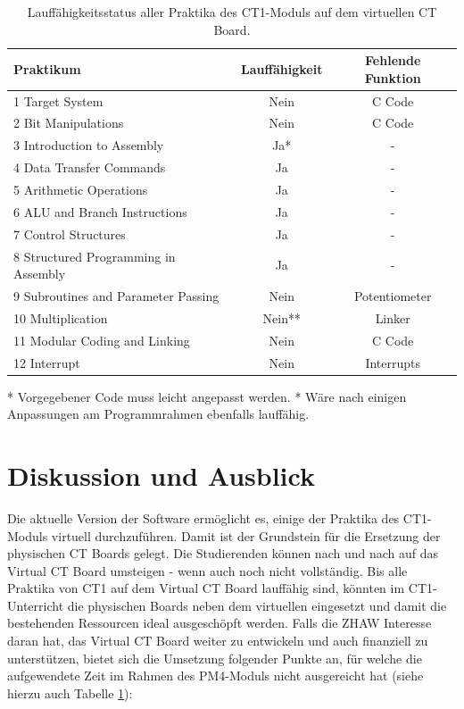 \documentclass[10pt]{article}
\begin{document}
\begin{table}[ht]
\begin{tabular}{ | l | c | c |}
	\hline
    \textbf{Praktikum} & \textbf{Lauffähigkeit} & \textbf{Fehlende Funktion} \\
	\hline
    1 Target System & Nein & C Code \\
	\hline
    2 Bit Manipulations & Nein & C Code \\
\hline
    3 Introduction to Assembly & Ja* & - \\
\hline
    4 Data Transfer Commands & Ja & - \\
\hline
    5 Arithmetic Operations & Ja & - \\
\hline
    6 ALU and Branch Instructions & Ja & - \\
\hline
    7 Control Structures & Ja & - \\
\hline
    8 Structured Programming in Assembly & Ja & - \\
\hline
    9 Subroutines and Parameter Passing & Nein & Potentiometer \\
\hline
    10 Multiplication & Nein** & Linker \\
\hline
    11 Modular Coding and Linking & Nein & C Code \\
\hline
    12 Interrupt & Nein & Interrupts \\
\hline
\end{tabular}
* Vorgegebener Code muss leicht angepasst werden.
\newline** Wäre nach einigen Anpassungen am Programmrahmen ebenfalls lauffähig.
\caption[size=8pt]{Lauffähigkeitsstatus aller Praktika des CT1-Moduls auf dem virtuellen CT Board.}
\label{praktika}
\end{table}

\section{Diskussion und Ausblick}

Die aktuelle Version der Software ermöglicht es, einige der Praktika des CT1-Moduls virtuell durchzuführen. Damit ist der Grundstein für die Ersetzung der physischen CT Boards gelegt. Die Studierenden können nach und nach auf das \glqq Virtual CT Board\grqq{} umsteigen - wenn auch noch nicht vollständig. Bis alle Praktika von CT1 auf dem \glqq Virtual CT Board\grqq{} lauffähig sind, könnten im CT1-Unterricht die physischen Boards neben dem virtuellen eingesetzt und damit die bestehenden Ressourcen ideal ausgeschöpft werden. Falls die ZHAW Interesse daran hat, das \glqq Virtual CT Board\grqq{} weiter zu entwickeln und auch finanziell zu unterstützen, bietet sich die Umsetzung folgender Punkte an, für welche die aufgewendete Zeit im Rahmen des PM4-Moduls nicht ausgereicht hat (siehe hierzu auch Tabelle \ref{praktika}):
\end{document}
